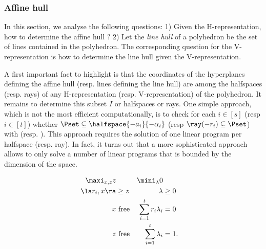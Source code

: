 \documentclass[11pt,twoside,a4paper,openright]{uclouvain-thesis}
\newcommand{\ineqnum}{s}
\begin{document}
\subsubsection{Affine hull}
\label{sec:affine_hull}
In this section, we analyse the following questions:
1) Given the H-representation, how to determine the affine hull ?
2) Let the \emph{line hull} of a polyhedron be the set of lines contained
in the polyhedron.
The corresponding question for the V-representation is how to determine the line hull given the V-representation.

A first important fact to highlight is that the coordinates of the hyperplanes
defining the affine hull (resp. lines defining the line hull)
are among the halfspaces (resp. rays) of any H-representation (resp. V-representation) of the polyhedron.
It remains to determine this subset $I$ or halfspaces or rays.
One simple approach, which is not the most efficient computationally,
is to check for each $i \in [\ineqnum]$ (resp $i \in [t]$) whether
$\Pset \subseteq \halfspace{-a_i}{-\alpha_i}$ (resp $\ray(-r_i) \subseteq \Pset$)
with  (resp. ).
This approach requires the solution of one linear program per halfspace
(resp. ray).
In fact, it turns out that a more sophisticated approach allows to only
solve a number of linear programs that is bounded by the dimension of the space.

\begin{myprog}
  \label{prog:line}
  \begin{align*}
    \maxi_{x, z} z && \mini_{\lambda} 0\\
    \la r_i, x \ra & \ge z & \lambda & \ge 0\\
    x & \text{ free} & \sum_{i=1}^t r_i \lambda_i & = 0\\
    z & \text{ free} & \sum_{i=1}^t \lambda_i & = 1.
  \end{align*}
\end{myprog}
\end{document}
